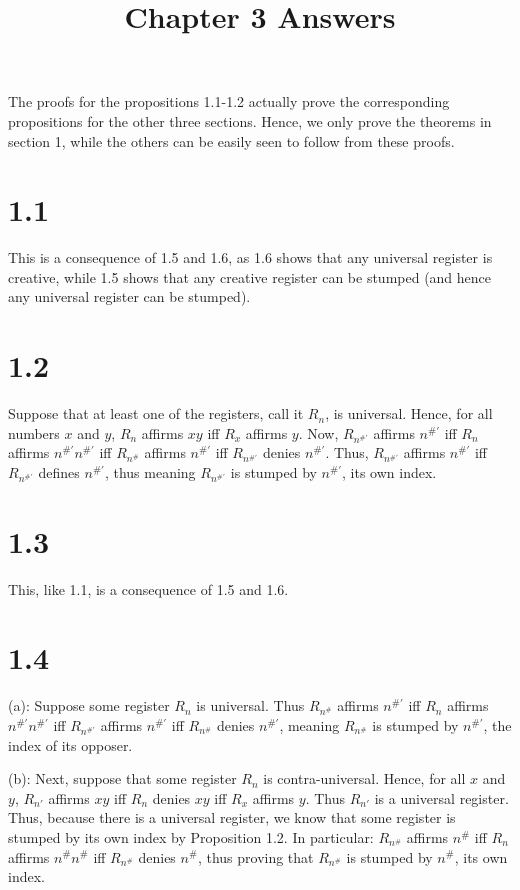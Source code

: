 \documentclass{article}
\title{Chapter 3 Answers}
\theoremstyle{definition}
\begin{document}
\date{}
\maketitle

The proofs for the propositions 1.1-1.2 actually prove the corresponding propositions for the other three sections. Hence, we only prove the 
theorems in section 1, while the others can be easily seen to follow from these proofs. 

\section*{1.1}
This is a consequence of 1.5 and 1.6, as 1.6 shows that any universal register is creative, while 1.5 shows that any creative register can be 
stumped (and hence any universal register can be stumped).

\section*{1.2}
Suppose that at least one of the registers, call it $R_n$, is universal. Hence, for all numbers $x$ and $y$, $R_n$ affirms $xy$ iff $R_x$ affirms 
$y$. Now, $R_{n^{\#'}}$ affirms $n^{\#'}$ iff $R_n$ affirms $n^{\#'}n^{\#'}$ iff $R_{n^\#}$ affirms $n^{\#'}$ iff $R_{n^{\#'}}$ denies $n^{\#'}$. Thus, 
$R_{n^{\#'}}$ affirms $n^{\#'}$ iff $R_{n^{\#'}}$ defines $n^{\#'}$, thus meaning $R_{n^{\#'}}$ is stumped by $n^{\#'}$, its own index. 

\section*{1.3}
This, like 1.1, is a consequence of 1.5 and 1.6.

\section*{1.4}
(a): Suppose some register $R_n$ is universal. Thus $R_{n^{\#}}$ affirms $n^{\#'}$ iff $R_n$ affirms $n^{\#'}n^{\#'}$ iff $R_{n^{\#'}}$ affirms $n^{\#'}$ 
iff $R_{n^{\#}}$ denies $n^{\#'}$, 
 meaning $R_{n^\#}$ is stumped by $n^{\#'}$, the index of its opposer.


(b): Next, suppose that some register $R_n$ is contra-universal. Hence, for all $x$ and $y$, $R_{n'}$ affirms $xy$ iff $R_n$ denies $xy$ iff 
$R_x$ affirms $y$. Thus $R_{n'}$ is a universal register. Thus, because there is a universal register, we know that some register is stumped by its own 
index by Proposition 1.2. In particular: $R_{n^\#}$ affirms $n^\#$ iff $R_n$ affirms $n^\#n^\#$ iff $R_{n^{\#}}$ denies $n^\#$, 
thus proving that $R_{n^\#}$ is stumped by $n^\#$, its own index. 
\end{document}

